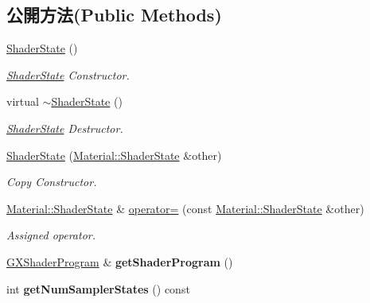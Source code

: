 \subsection*{公開方法(Public Methods)}
\begin{DoxyCompactItemize}
\item 
\hyperlink{class_i_dream_sky_1_1_material_1_1_shader_state_a136c9efd9ca8e1506bba6a2b413e14fc}{Shader\+State} ()
\begin{DoxyCompactList}\small\item\em \hyperlink{class_i_dream_sky_1_1_material_1_1_shader_state}{Shader\+State} Constructor. \end{DoxyCompactList}\item 
virtual \hyperlink{class_i_dream_sky_1_1_material_1_1_shader_state_af53e63ba16b2ff1fdda59d396d52ab9e}{$\sim$\+Shader\+State} ()
\begin{DoxyCompactList}\small\item\em \hyperlink{class_i_dream_sky_1_1_material_1_1_shader_state}{Shader\+State} Destructor. \end{DoxyCompactList}\item 
\hyperlink{class_i_dream_sky_1_1_material_1_1_shader_state_a4236bb4848d2cfcc915ded3b7e98ef85}{Shader\+State} (\hyperlink{class_i_dream_sky_1_1_material_1_1_shader_state}{Material\+::\+Shader\+State} \&other)
\begin{DoxyCompactList}\small\item\em Copy Constructor. \end{DoxyCompactList}\item 
\hyperlink{class_i_dream_sky_1_1_material_1_1_shader_state}{Material\+::\+Shader\+State} \& \hyperlink{class_i_dream_sky_1_1_material_1_1_shader_state_a87ce1a3faa6f5680033047b349d02893}{operator=} (const \hyperlink{class_i_dream_sky_1_1_material_1_1_shader_state}{Material\+::\+Shader\+State} \&other)
\begin{DoxyCompactList}\small\item\em Assigned operator. \end{DoxyCompactList}\item 
\hyperlink{class_i_dream_sky_1_1_g_x_shader_program}{G\+X\+Shader\+Program} \& {\bfseries get\+Shader\+Program} ()\hypertarget{class_i_dream_sky_1_1_material_1_1_shader_state_a0f8f3634b19c8e3cf88e0e8558933e5c}{}\label{class_i_dream_sky_1_1_material_1_1_shader_state_a0f8f3634b19c8e3cf88e0e8558933e5c}

\item 
int {\bfseries get\+Num\+Sampler\+States} () const \hypertarget{class_i_dream_sky_1_1_material_1_1_shader_state_a94f0c0987667eca7b07c5e6b712ebd6d}{}\label{class_i_dream_sky_1_1_material_1_1_shader_state_a94f0c0987667eca7b07c5e6b712ebd6d}


\end{DoxyCompactItemize}
